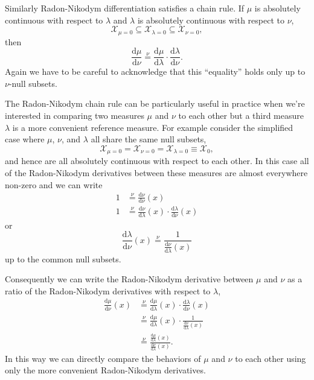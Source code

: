 \documentclass[
  letterpaper,
  DIV=11,
  numbers=noendperiod]{scrartcl}
\begin{document}
Similarly Radon-Nikodym differentiation satisfies a chain rule. If
\(\mu\) is absolutely continuous with respect to \(\lambda\) and
\(\lambda\) is absolutely continuous with respect to \(\nu\), \[
\mathcal{X}_{\mu = 0}
\subseteq \mathcal{X}_{\lambda = 0}
\subseteq \mathcal{X}_{\nu = 0},
\] then \[
\frac{ \mathrm{d} \mu}{ \mathrm{d} \nu}
\overset{\nu}{=}
\frac{ \mathrm{d} \mu}{ \mathrm{d} \lambda } \cdot
\frac{ \mathrm{d} \lambda}{ \mathrm{d} \nu }.
\] Again we have to be careful to acknowledge that this ``equality''
holds only up to \(\nu\)-null subsets.

The Radon-Nikodym chain rule can be particularly useful in practice when
we're interested in comparing two measures \(\mu\) and \(\nu\) to each
other but a third measure \(\lambda\) is a more convenient reference
measure. For example consider the simplified case where \(\mu\),
\(\nu\), and \(\lambda\) all share the same null subsets, \[
  \mathcal{X}_{\mu = 0}
= \mathcal{X}_{\nu = 0}
= \mathcal{X}_{\lambda = 0}
\equiv \mathcal{X}_{0},
\] and hence are all absolutely continuous with respect to each other.
In this case all of the Radon-Nikodym derivatives between these measures
are almost everywhere non-zero and we can write \begin{align*}
1
&\overset{\nu}{=}
\frac{ \mathrm{d} \nu}{ \mathrm{d} \nu}(x)
\\
1
&\overset{\nu}{=}
\frac{ \mathrm{d} \nu}{ \mathrm{d} \lambda }(x) \cdot
\frac{ \mathrm{d} \lambda}{ \mathrm{d} \nu }(x)
\end{align*} or \[
\frac{ \mathrm{d} \lambda}{ \mathrm{d} \nu }(x)
\overset{\nu}{=}
\frac{1}{ \frac{ \mathrm{d} \nu}{ \mathrm{d} \lambda }(x) }
\] up to the common null subsets.

Consequently we can write the Radon-Nikodym derivative between \(\mu\)
and \(\nu\) as a ratio of the Radon-Nikodym derivatives with respect to
\(\lambda\), \begin{align*}
\frac{ \mathrm{d} \mu}{ \mathrm{d} \nu}(x)
&\overset{\nu}{=}
\frac{ \mathrm{d} \mu}{ \mathrm{d} \lambda }(x) \cdot
\frac{ \mathrm{d} \lambda}{ \mathrm{d} \nu }(x)
\\
&\overset{\nu}{=}
\frac{ \mathrm{d} \mu}{ \mathrm{d} \lambda }(x) \cdot
\frac{1}{ \frac{ \mathrm{d} \nu}{ \mathrm{d} \lambda }(x) }
\\
&\overset{\nu}{=}
\frac{ \frac{ \mathrm{d} \mu}{ \mathrm{d} \lambda }(x) }
{ \frac{ \mathrm{d} \nu}{ \mathrm{d} \lambda }(x) }.
\end{align*} In this way we can directly compare the behaviors of
\(\mu\) and \(\nu\) to each other using only the more convenient
Radon-Nikodym derivatives.
\end{document}
